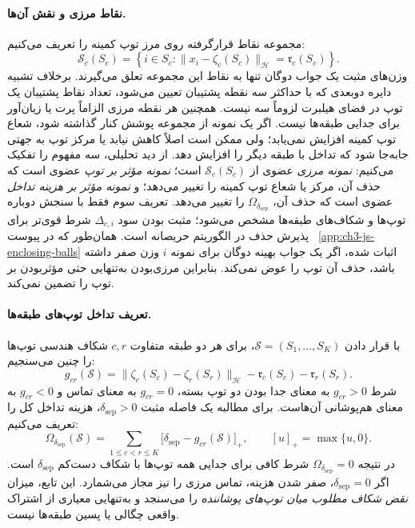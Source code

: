 \paragraph{نقاط مرزی و نقش آن‌ها.}
مجموعه نقاط قرارگرفته روی مرز
توپ کمینه را تعریف می‌کنیم:
\begin{equation}\label{cmp:eq:ch3-outlier-js-meb-boundary}
\mathcal S_c(S_c)=
\left\{i\in S_c:
\|x_i-\zeta_c(S_c)\|_{\mathcal H}
=\mathfrak r_c(S_c)\right\}.
\end{equation}
وزن‌های مثبت یک جواب دوگان
تنها به نقاط این مجموعه تعلق می‌گیرند.
برخلاف تشبیه دایره دوبعدی که
با حداکثر سه نقطه پشتیبان
تعیین می‌شود، تعداد نقاط
پشتیبان یک توپ در فضای هیلبرت
لزوماً سه نیست. همچنین هر نقطه
مرزی الزاماً پرت یا زیان‌آور
برای جدایی طبقه‌ها نیست.
اگر یک نمونه از مجموعه پوشش
کنار گذاشته شود، شعاع توپ کمینه
افزایش نمی‌یابد؛ ولی ممکن است
اصلاً کاهش نیابد یا مرکز توپ
به جهتی جابه‌جا شود که تداخل
با طبقه دیگر را افزایش دهد.
از دید تحلیلی، سه مفهوم
را تفکیک می‌کنیم:
\emph{نمونه مرزی} عضوی از
$\mathcal S_c(S_c)$ است؛
\emph{نمونه مؤثر بر توپ}
عضوی است که حذف آن، مرکز یا
شعاع توپ کمینه را تغییر می‌دهد؛
و \emph{نمونه مؤثر بر هزینه
تداخل} عضوی است که حذف آن،
$\Omega_{\delta_{\mathrm{sep}}}$
را تغییر می‌دهد. تعریف سوم
فقط با سنجش دوباره توپ‌ها
و شکاف‌های طبقه‌ها مشخص
می‌شود؛ مثبت بودن سود
$\Delta_{c,i}$ شرط قوی‌تر
برای پذیرش حذف در الگوریتم
حریصانه است.
همان‌طور که در پیوست~
\ref{app:ch3-js-enclosing-balls}
اثبات شده، اگر یک جواب
بهینه دوگان برای نمونه
$i$ وزن صفر داشته باشد،
حذف آن توپ را عوض نمی‌کند.
بنابراین مرزی‌بودن به‌تنهایی
حتی مؤثربودن بر توپ را
تضمین نمی‌کند.

\paragraph{تعریف تداخل توپ‌های طبقه‌ها.}
با قرار دادن
$\mathscr S=(S_1,\ldots,S_K)$،
برای هر دو طبقه متفاوت $c,r$
شکاف هندسی توپ‌ها را چنین می‌سنجیم:
\begin{equation}\label{cmp:eq:ch3-outlier-js-ball-gap}
g_{cr}(\mathscr S)=
\|\zeta_c(S_c)-\zeta_r(S_r)\|_{\mathcal H}
-\mathfrak r_c(S_c)-\mathfrak r_r(S_r).
\end{equation}
شرط $g_{cr}>0$ به معنای
جدا بودن دو توپ بسته،
$g_{cr}=0$ به معنای تماس
و $g_{cr}<0$ به معنای
هم‌پوشانی آن‌هاست.
برای مطالبه یک فاصله مثبت
$\delta_{\mathrm{sep}}>0$،
هزینه تداخل کل را تعریف می‌کنیم:
\begin{equation}\label{cmp:eq:ch3-outlier-js-total-overlap}
\boxed{
\Omega_{\delta_{\mathrm{sep}}}(\mathscr S)=
\sum_{1\le c<r\le K}
\bigl[\delta_{\mathrm{sep}}-g_{cr}(\mathscr S)\bigr]_+,
\qquad [u]_+=\max\{u,0\}.
}
\end{equation}
در نتیجه $\Omega_{\delta_{\mathrm{sep}}}=0$
شرط کافی برای جدایی همه توپ‌ها
با شکاف دست‌کم
$\delta_{\mathrm{sep}}$ است.
اگر $\delta_{\mathrm{sep}}=0$،
صفر شدن هزینه، تماس مرزی را
نیز مجاز می‌شمارد.
این تابع، میزان \emph{نقض
شکاف مطلوب میان توپ‌های
پوشاننده} را می‌سنجد و
به‌تنهایی معیاری از اشتراک
واقعی چگالی یا پسین طبقه‌ها
نیست.

